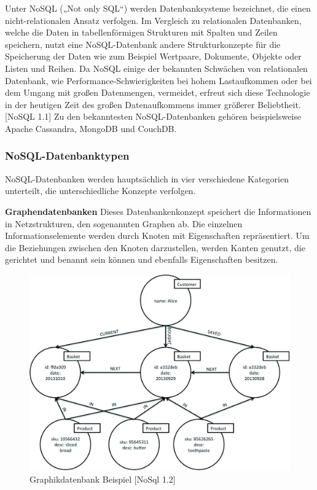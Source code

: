 Unter NoSQL („Not only SQL“) werden Datenbanksysteme bezeichnet, die einen nicht-relationalen Ansatz verfolgen. Im Vergleich zu relationalen Datenbanken, welche die Daten in tabellenförmigen Strukturen mit Spalten und Zeilen speichern, nutzt eine NoSQL-Datenbank andere Strukturkonzepte für die Speicherung der Daten wie zum Beispiel Wertpaare, Dokumente, Objekte oder Listen und Reihen. Da NoSQL einige der bekannten Schwächen von relationalen Datenbank, wie Performance-Schwierigkeiten bei hohem Lastaufkommen oder bei dem Umgang mit großen Datenmengen, vermeidet, erfreut sich diese Technologie in der heutigen Zeit des großen Datenaufkommens immer größerer Beliebtheit. [NoSQL 1.1]
Zu den bekanntesten NoSQL-Datenbanken gehören beispielsweise Apache Cassandra, MongoDB und CouchDB.
\newline

\subsubsection{NoSQL-Datenbanktypen}
NoSQL-Datenbanken werden hauptsächlich in vier verschiedene Kategorien unterteilt, die unterschiedliche Konzepte verfolgen.
\newline

\textbf{Graphendatenbanken}
Dieses Datenbankenkonzept speichert die Informationen in Netzstrukturen, den sogenannten Graphen ab. Die einzelnen Informationselemente werden durch Knoten mit Eigenschaften repräsentiert. Um die Beziehungen zwischen den Knoten darzustellen, werden Kanten genutzt, die gerichtet und benannt sein können und ebenfalls Eigenschaften besitzen.

\begin{figure}[h]
\centering
\includegraphics[]{images/graphikdatabase.jpg}
\caption{Graphikdatenbank Beispiel [NoSql 1.2]}
\end{figure}

